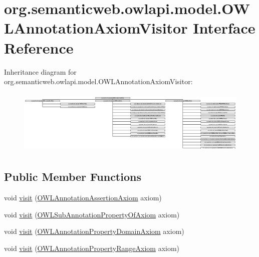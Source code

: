 \hypertarget{interfaceorg_1_1semanticweb_1_1owlapi_1_1model_1_1_o_w_l_annotation_axiom_visitor}{\section{org.\-semanticweb.\-owlapi.\-model.\-O\-W\-L\-Annotation\-Axiom\-Visitor Interface Reference}
\label{interfaceorg_1_1semanticweb_1_1owlapi_1_1model_1_1_o_w_l_annotation_axiom_visitor}
}
Inheritance diagram for org.\-semanticweb.\-owlapi.\-model.\-O\-W\-L\-Annotation\-Axiom\-Visitor\-:\begin{figure}[H]
\begin{center}
\leavevmode
\includegraphics[height=3.111111cm]{interfaceorg_1_1semanticweb_1_1owlapi_1_1model_1_1_o_w_l_annotation_axiom_visitor}
\end{center}
\end{figure}
\subsection*{Public Member Functions}
\begin{DoxyCompactItemize}
\item 
void \hyperlink{interfaceorg_1_1semanticweb_1_1owlapi_1_1model_1_1_o_w_l_annotation_axiom_visitor_a38faec3e9bdd83355fa7a8896f33eb0b}{visit} (\hyperlink{interfaceorg_1_1semanticweb_1_1owlapi_1_1model_1_1_o_w_l_annotation_assertion_axiom}{O\-W\-L\-Annotation\-Assertion\-Axiom} axiom)
\item 
void \hyperlink{interfaceorg_1_1semanticweb_1_1owlapi_1_1model_1_1_o_w_l_annotation_axiom_visitor_a7e5e14ac071548ee1eda13164124acb1}{visit} (\hyperlink{interfaceorg_1_1semanticweb_1_1owlapi_1_1model_1_1_o_w_l_sub_annotation_property_of_axiom}{O\-W\-L\-Sub\-Annotation\-Property\-Of\-Axiom} axiom)
\item 
void \hyperlink{interfaceorg_1_1semanticweb_1_1owlapi_1_1model_1_1_o_w_l_annotation_axiom_visitor_af17034ef48044ee27cc746ba4aa48c96}{visit} (\hyperlink{interfaceorg_1_1semanticweb_1_1owlapi_1_1model_1_1_o_w_l_annotation_property_domain_axiom}{O\-W\-L\-Annotation\-Property\-Domain\-Axiom} axiom)
\item 
void \hyperlink{interfaceorg_1_1semanticweb_1_1owlapi_1_1model_1_1_o_w_l_annotation_axiom_visitor_aed8b833a7b0843967bb500f106687231}{visit} (\hyperlink{interfaceorg_1_1semanticweb_1_1owlapi_1_1model_1_1_o_w_l_annotation_property_range_axiom}{O\-W\-L\-Annotation\-Property\-Range\-Axiom} axiom)
\end{DoxyCompactItemize}


